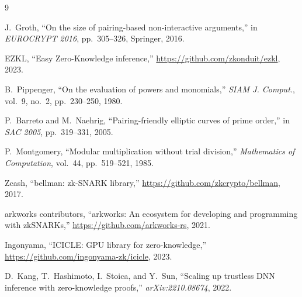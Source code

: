 \documentclass[11pt,a4paper]{article}
\begin{document}
\begin{thebibliography}{9}

J.~Groth, ``On the size of pairing-based non-interactive arguments,''
in \textit{EUROCRYPT 2016}, pp.~305--326, Springer, 2016.

EZKL, ``Easy Zero-Knowledge inference,''
\url{https://github.com/zkonduit/ezkl}, 2023.

B.~Pippenger, ``On the evaluation of powers and monomials,''
\textit{SIAM J. Comput.}, vol.~9, no.~2, pp.~230--250, 1980.

P.~Barreto and M.~Naehrig, ``Pairing-friendly elliptic curves
of prime order,'' in \textit{SAC 2005}, pp.~319--331, 2005.

P.~Montgomery, ``Modular multiplication without trial division,''
\textit{Mathematics of Computation}, vol.~44, pp.~519--521, 1985.

Zcash, ``bellman: zk-SNARK library,''
\url{https://github.com/zkcrypto/bellman}, 2017.

arkworks contributors, ``arkworks: An ecosystem for developing
and programming with zkSNARKs,''
\url{https://github.com/arkworks-rs}, 2021.

Ingonyama, ``ICICLE: GPU library for zero-knowledge,''
\url{https://github.com/ingonyama-zk/icicle}, 2023.

D.~Kang, T.~Hashimoto, I.~Stoica, and Y.~Sun,
``Scaling up trustless DNN inference with zero-knowledge proofs,''
\textit{arXiv:2210.08674}, 2022.

\end{thebibliography}
\end{document}

